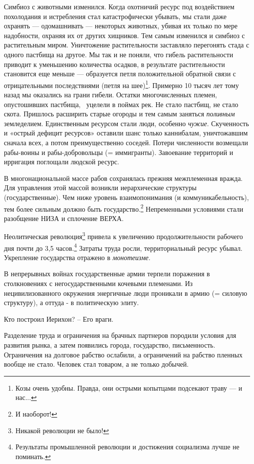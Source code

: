 Симбиоз с животными изменился. Когда охотничий ресурс под воздействием похолодания и истребления стал катастрофически
убывать, мы стали даже охранять — одомашнивать — некоторых животных, убивая их только по мере надобности, охраняя их от
других хищников. Тем самым изменился и симбиоз с растительным миром. Уничтожение растительности заставляло  перегонять стада с одного пастбища на другое. Мы так и не поняли, что гибель растительности приводит к уменьшению количества осадков, в результате растительности становится еще меньше — образуется петля положительной обратной связи с отрицательными последствиями (петля на шее)\footnote{Козы очень удобны. Правда, они острыми копытцами подсекают траву — и нас...}. Примерно 10 тысяч лет тому назад мы оказались на грани гибели. Остатки многочисленных племен, опустошивших пастбища, \ уцелели в поймах рек. Не стало пастбищ, не стало скота. Пришлось расширить старые огороды и тем самым заняться \textit{поливным }земледелием. Единственным ресурсом стали люди, особенно \textit{чужие}. Скученность и «острый дефицит ресурсов» оставили шанс только каннибалам, уничтожавшим сначала всех, а потом преимущественно соседей. Потери численности возмещали рабы-воины и рабы-добровольцы (= иммигранты). Завоевание территорий и ирригация поглощали людской ресурс.

В многонациональной массе рабов сохранялась прежняя межплеменная вражда. Для управления этой массой возникли
иерархические структуры (государственные). Чем ниже уровень взаимопонимания (и коммуникабельность), тем более сильным должно быть государство.\footnote{И наоборот!} Непременными условиями стали разобщение НИЗА и сплочение ВЕРХА.

Неолитическая революция\footnote{Никакой революции не было!} 
привела к увеличению
продолжительности рабочего дня почти до 3,5 часов.\footnote{Результаты промышленной революции и достижения социализма лучше не поминать.} 
Затраты труда росли, территориальный ресурс убывал. Укрепление
государства отражено в \textit{монотеизме}.

В непрерывных войнах государственные армии терпели поражения в столкновениях с негосударственными кочевыми племенами. Из
нецивилизованного окружения энергичные люди проникали в армию (= силовую структуру), а оттуда - в политическую элиту.

Кто построил Иерихон? – Его враги.

Разделение труда и ограничения на брачных партнеров породили условия для развития рынка, а затем появились города,
государство, письменность. Ограничения на долговое рабство ослабили, а ограничений на рабство пленных вообще не стало.
Человек стал товаром, а не только добычей. 

